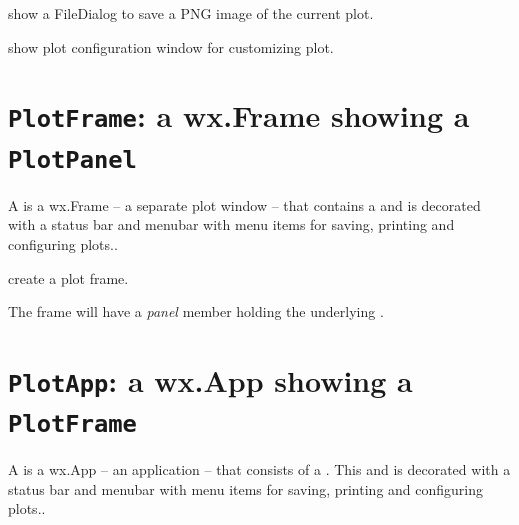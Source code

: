 \documentclass[letterpaper,10pt,english]{sphinxmanual}
\begin{document}
\begin{fulllineitems}
\label{plotpanel:save_figure}
show a FileDialog to save a PNG image of the current plot.

\end{fulllineitems}



\begin{fulllineitems}
\label{plotpanel:configure}
show plot configuration window for customizing plot.

\end{fulllineitems}



\section{\texttt{PlotFrame}: a wx.Frame showing a \texttt{PlotPanel}}
\label{plotpanel:plotframe-a-wx-frame-showing-a-plotpanel}
A {\hyperref[plotpanel:PlotFrame]{}} is a wx.Frame -- a separate plot window -- that
contains a {\hyperref[plotpanel:PlotPanel]{}} and is decorated with a status bar and
menubar with menu items for saving, printing and configuring plots..


\begin{fulllineitems}
\label{plotpanel:PlotFrame}
create a plot frame.

\end{fulllineitems}


The frame will have a \emph{panel} member holding the underlying {\hyperref[plotpanel:PlotPanel]{}}.


\section{\texttt{PlotApp}: a wx.App showing a \texttt{PlotFrame}}
\label{plotpanel:plotapp-a-wx-app-showing-a-plotframe}
A  is a wx.App -- an application  -- that
consists of a {\hyperref[plotpanel:PlotFrame]{}}.   This  and is decorated with a status bar and
menubar with menu items for saving, printing and configuring plots..
\end{document}
